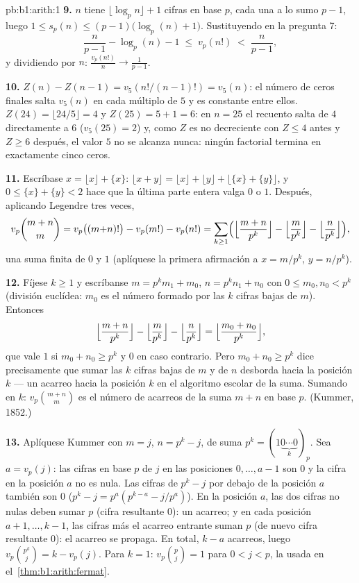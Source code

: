 \begin{solution}{pb:b1:arith:1}
\textbf{9.} $n$ tiene $\lfloor \log_p n \rfloor + 1$ cifras en base
$p$, cada una a lo sumo $p - 1$, luego
$1 \leq s_p(n) \leq (p-1)\bigl(\log_p(n) + 1\bigr)$. Sustituyendo en
la pregunta 7:
\[
\frac n{p-1} - \log_p(n) - 1 \;\leq\; v_p(n!) \;<\; \frac n{p-1},
\]
y dividiendo por $n$: $\frac{v_p(n!)}n \to \frac1{p-1}$.

\textbf{10.} $Z(n) - Z(n-1) = v_5(n!/(n-1)!) = v_5(n)$: el número de
ceros finales salta $v_5(n)$ en cada múltiplo de $5$ y es constante
entre ellos. $Z(24) = \lfloor24/5\rfloor = 4$ y $Z(25) = 5 + 1 = 6$:
en $n = 25$ el recuento salta de $4$ directamente a $6$
($v_5(25) = 2$) y, como $Z$ es no decreciente con $Z \leq 4$ antes y
$Z \geq 6$ después, el valor $5$ no se alcanza nunca: ningún factorial
termina en exactamente cinco ceros.

\textbf{11.} Escríbase $x = \lfloor x\rfloor + \{x\}$:
$\lfloor x + y\rfloor = \lfloor x\rfloor + \lfloor y\rfloor +
\lfloor \{x\} + \{y\}\rfloor$, y $0 \leq \{x\} + \{y\} < 2$ hace que
la última parte entera valga $0$ o $1$. Después, aplicando Legendre
tres veces,
\[
v_p\binom{m+n}m = v_p\bigl((m{+}n)!\bigr) - v_p(m!) - v_p(n!)
= \sum_{k\geq1}\Bigl(
\Bigl\lfloor\frac{m+n}{p^k}\Bigr\rfloor
- \Bigl\lfloor\frac{m}{p^k}\Bigr\rfloor
- \Bigl\lfloor\frac{n}{p^k}\Bigr\rfloor\Bigr),
\]
una suma finita de $0$ y $1$ (aplíquese la primera afirmación a
$x = m/p^k$, $y = n/p^k$).

\textbf{12.} Fíjese $k \geq 1$ y escríbanse $m = p^km_1 + m_0$,
$n = p^kn_1 + n_0$ con $0 \leq m_0, n_0 < p^k$ (división euclídea:
$m_0$ es el número formado por las $k$ cifras bajas de $m$). Entonces
\[
\Bigl\lfloor\frac{m+n}{p^k}\Bigr\rfloor
- \Bigl\lfloor\frac m{p^k}\Bigr\rfloor
- \Bigl\lfloor\frac n{p^k}\Bigr\rfloor
= \Bigl\lfloor\frac{m_0 + n_0}{p^k}\Bigr\rfloor ,
\]
que vale $1$ si $m_0 + n_0 \geq p^k$ y $0$ en caso contrario. Pero
$m_0 + n_0 \geq p^k$ dice precisamente que sumar las $k$ cifras bajas
de $m$ y de $n$ desborda hacia la posición $k$ --- un acarreo hacia la
posición $k$ en el algoritmo escolar de la suma. Sumando en $k$:
$v_p\binom{m+n}m$ es el número de acarreos de la suma $m + n$ en base
$p$. (Kummer, 1852.)

\textbf{13.} Aplíquese Kummer con $m = j$, $n = p^k - j$, de suma
$p^k = (1\underbrace{0\cdots0}_{k})_p$. Sea $a = v_p(j)$: las cifras
en base $p$ de $j$ en las posiciones $0, \dots, a-1$ son $0$ y la
cifra en la posición $a$ no es nula. Las cifras de $p^k - j$ por
debajo de la posición $a$ también son $0$
($p^k - j = p^a(p^{k-a} - j/p^a)$). En la posición $a$, las dos cifras
no nulas deben sumar $p$ (cifra resultante $0$): un acarreo; y en cada
posición $a+1, \dots, k-1$, las cifras más el acarreo entrante suman
$p$ (de nuevo cifra resultante $0$): el acarreo se propaga. En total,
$k - a$ acarreos, luego $v_p\binom{p^k}j = k - v_p(j)$. Para $k = 1$:
$v_p\binom pj = 1$ para $0 < j < p$, la  usada en
el~\cref{thm:b1:arith:fermat}.


\end{solution}
